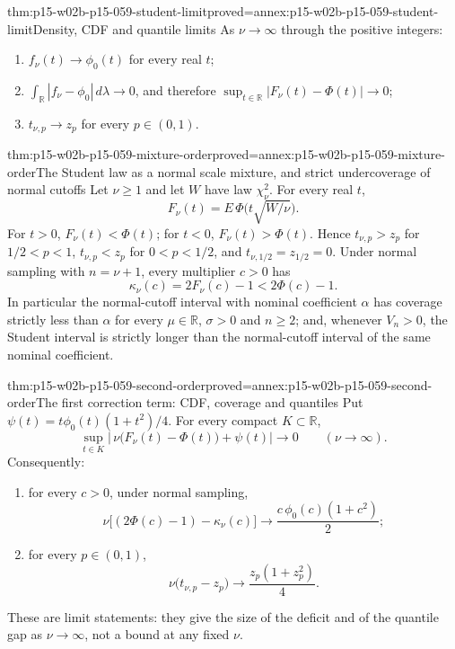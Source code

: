 \begin{hbtheorem}{thm:p15-w02b-p15-059-student-limit}{proved=annex:p15-w02b-p15-059-student-limit}{Density, CDF and quantile limits}
As \(\nu\to\infty\) through the positive integers:
\begin{enumerate}
\item \(f_\nu(t)\to\phi_0(t)\) for every real \(t\);
\item \(\int_{\mathbb R}|f_\nu-\phi_0|\,d\lambda\to0\), and therefore
\(\sup_{t\in\mathbb R}|F_\nu(t)-\Phi(t)|\to0\);
\item \(t_{\nu,p}\to z_p\) for every \(p\in(0,1)\).
\end{enumerate}
\end{hbtheorem}

\begin{hbtheorem}{thm:p15-w02b-p15-059-mixture-order}{proved=annex:p15-w02b-p15-059-mixture-order}{The Student law as a normal scale mixture, and strict undercoverage of normal cutoffs}
Let \(\nu\geq1\) and let \(W\) have law \(\chi^2_\nu\). For every real
\(t\),
\[
 F_\nu(t)=E\,\Phi\bigl(t\sqrt{W/\nu}\bigr).
\]
For \(t>0\), \(F_\nu(t)<\Phi(t)\); for \(t<0\), \(F_\nu(t)>\Phi(t)\).
Hence \(t_{\nu,p}>z_p\) for \(1/2<p<1\), \(t_{\nu,p}<z_p\) for
\(0<p<1/2\), and \(t_{\nu,1/2}=z_{1/2}=0\). Under normal sampling with
\(n=\nu+1\), every multiplier \(c>0\) has
\[
 \kappa_\nu(c)=2F_\nu(c)-1<2\Phi(c)-1 .
\]
In particular the normal-cutoff interval with nominal coefficient
\(\alpha\) has coverage strictly less than \(\alpha\) for every
\(\mu\in\mathbb R\), \(\sigma>0\) and \(n\geq2\); and, whenever
\(V_n>0\), the Student interval is strictly longer than the normal-cutoff
interval of the same nominal coefficient.
\end{hbtheorem}

\begin{hbtheorem}{thm:p15-w02b-p15-059-second-order}{proved=annex:p15-w02b-p15-059-second-order}{The first correction term: CDF, coverage and quantiles}
Put \(\psi(t)=t\phi_0(t)(1+t^2)/4\). For every compact
\(K\subset\mathbb R\),
\[
 \sup_{t\in K}\bigl|\,\nu\bigl(F_\nu(t)-\Phi(t)\bigr)+\psi(t)\bigr|
 \longrightarrow0\qquad(\nu\to\infty).
\]
Consequently:
\begin{enumerate}
\item for every \(c>0\), under normal sampling,
\[
 \nu\bigl[(2\Phi(c)-1)-\kappa_\nu(c)\bigr]\longrightarrow
 \frac{c\,\phi_0(c)(1+c^2)}2 ;
\]
\item for every \(p\in(0,1)\),
\[
 \nu\bigl(t_{\nu,p}-z_p\bigr)\longrightarrow\frac{z_p(1+z_p^2)}4 .
\]
\end{enumerate}
These are limit statements: they give the size of the deficit and of the
quantile gap as \(\nu\to\infty\), not a bound at any fixed \(\nu\).
\end{hbtheorem}

